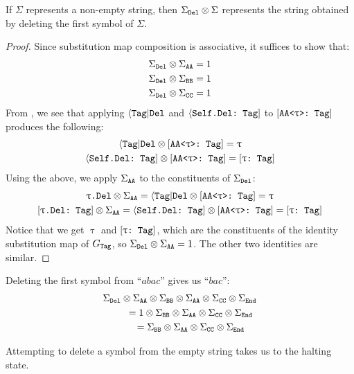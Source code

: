 \documentclass[../generics]{subfiles}
\begin{document}
\begin{lemma}\label{tag del lemma}
If $\Sigma$ represents a non-empty string, then $\Sigma_{\texttt{Del}}\otimes\Sigma$ represents the string obtained by deleting the first symbol of $\Sigma$.
\end{lemma}
\begin{proof}
Since substitution map composition is associative, it suffices to show that:
\begin{gather*}
\Sigma_{\texttt{Del}}\otimes\Sigma_{\texttt{AA}} = 1\\
\Sigma_{\texttt{Del}}\otimes\Sigma_{\texttt{BB}} = 1\\
\Sigma_{\texttt{Del}}\otimes\Sigma_{\texttt{CC}} = 1
\end{gather*}
From , we see that applying $\langle\texttt{Tag}|\texttt{Del}$ and $\langle\texttt{Self.Del:~Tag}]$ to $[\texttt{AA<$\uptau$>:~Tag}]$ produces the following:
\begin{gather*}
\langle\texttt{Tag}|\texttt{Del}\otimes[\texttt{AA<$\uptau$>:~Tag}]=\uptau\\
\langle\texttt{Self.Del:~Tag}]\otimes[\texttt{AA<$\uptau$>:~Tag}]=[\texttt{$\uptau$:~Tag}]
\end{gather*}
Using the above, we apply $\Sigma_{\texttt{AA}}$ to the constituents of $\Sigma_{\texttt{Del}}$:
\begin{gather*}
\texttt{$\uptau$.Del} \otimes \SigmaAA = \AssocTypeDel \otimes \ConfAATag = \uptau\\
\ConfReq{$\uptau$.Del}{Tag} \otimes \SigmaAA = \AssocConfDelTag \otimes \ConfAATag = \ConfTTag
\end{gather*}
Notice that we get $\uptau$ and $[\texttt{$\uptau$:~Tag}]$, which are the constituents of the identity substitution map of $G_\texttt{Tag}$, so $\Sigma_{\texttt{Del}}\otimes\Sigma_{\texttt{AA}}=1$. The other two identities are similar.
\end{proof}

\begin{example}
Deleting the first symbol from ``$abac$'' gives us ``$bac$'':
\begin{gather*}
\Sigma_{\texttt{Del}}\otimes\Sigma_{\texttt{AA}}\otimes\Sigma_{\texttt{BB}}\otimes\Sigma_{\texttt{AA}}\otimes\Sigma_{\texttt{CC}}\otimes\Sigma_{\texttt{End}}\\
\qquad {} =1\otimes\Sigma_{\texttt{BB}}\otimes\Sigma_{\texttt{AA}}\otimes\Sigma_{\texttt{CC}}\otimes\Sigma_{\texttt{End}}\\
\qquad {} =\Sigma_{\texttt{BB}}\otimes\Sigma_{\texttt{AA}}\otimes\Sigma_{\texttt{CC}}\otimes\Sigma_{\texttt{End}}
\end{gather*}
\end{example}

Attempting to delete a symbol from the empty string takes us to the halting state.
\end{document}
